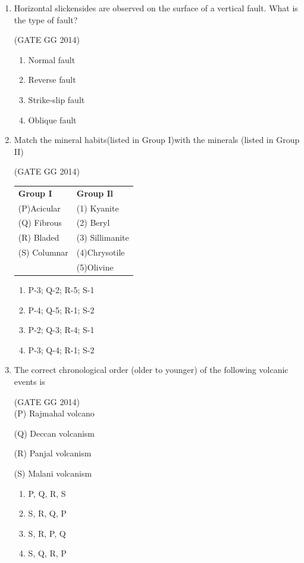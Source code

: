 \documentclass[journal]{IEEEtran}
\begin{document}
\begin{enumerate}[start=1]
\item Horizontal slickensides are observed on the surface of a vertical fault. What is the type of fault?

\hfill{(GATE GG 2014)}\\
\begin{multicols}{4}
    \begin{enumerate}
\item  Normal fault
\item Reverse fault
\item  Strike-slip fault
\item  Oblique fault
\end{enumerate}
\end{multicols}


\item Match the mineral habits(listed in Group I)with the minerals (listed in Group II)

\hfill{(GATE GG 2014)}\\
\begin{tabular}{ l l }
\textbf{Group I} & \textbf{Group Il}\\
 (P)Acicular & (1) Kyanite\\
(Q) Fibrous  & (2) Beryl\\
(R) Bladed & (3) Sillimanite\\
(S) Columnar & (4)Chrysotile\\
 & (5)Olivine
 \end{tabular}
 \begin{multicols}{2}
     \begin{enumerate}
    \item P-3; Q-2; R-5; S-1
    \item P-4; Q-5; R-1; S-2
    \item P-2; Q-3; R-4; S-1
    \item P-3; Q-4; R-1; S-2
\end{enumerate}
 \end{multicols}


\item  The correct chronological order (older to younger) of the following volcanic events is

\hfill{(GATE GG 2014)}\\
(P) Rajmahal volcano

(Q) Deccan volcanism

(R) Panjal volcanism

(S) Malani volcanism


\begin{enumerate}
    \item  P, Q, R, S
    \item S, R, Q, P
\item  S, R, P, Q
\item  S, Q, R, P
\end{enumerate}



\end{enumerate}
\end{document}
